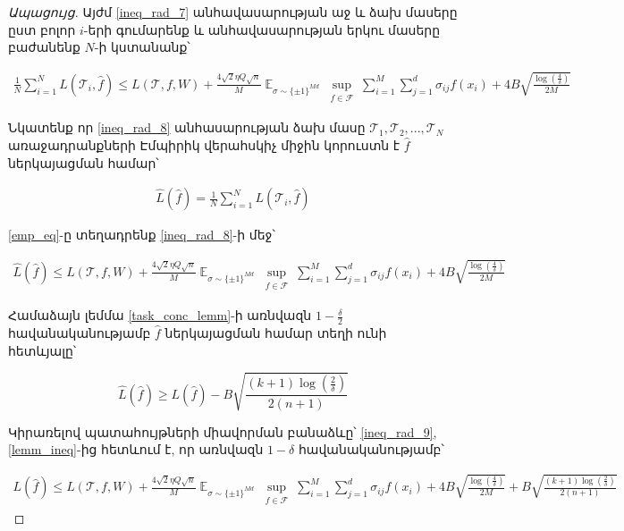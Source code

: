 \documentclass[12pt]{article}
\DeclareMathOperator*{\E}{\mathbb{E}}
\begin{document}
\begin{proof}[Ապացույց]
Այժմ \ref{ineq_rad_7} անհավասարության աջ և ձախ մասերը ըստ բոլոր $i $-երի գումարենք և անհավասարության երկու մասերը բաժանենք $N$-ի կստանանք՝

\begin{align}
\label{ineq_rad_8}
\frac{1}{N}\sum_{i=1}^NL(\mathcal{T}_i, \hat{f}) \leq  L(\mathcal{T}, f, W) + \frac{4\sqrt{2} \eta Q\sqrt{n}}{M} \E_{\sigma \sim \{\pm1\}^{Md}} \sup_{\substack{ f  \in \mathcal{F}  }}\sum_{i=1}^M \sum_{j=1}^d \sigma_{ij}f(x_i)+    4B\sqrt{\frac{\log \left( \frac{4}{\delta} \right)}{2M}}
\end{align}

Նկատենք որ \ref{ineq_rad_8} անհասարության ձախ մասը $\mathcal{T}_1,\mathcal{T}_2, ...,\mathcal{T}_N$ առաջադրանքների Էմպիրիկ վերահսկիչ միջին կորուստն է $\hat{f}$ ներկայացման համար՝


\begin{align}
\label{emp_eq}
\hat{L}(\hat{f}) = \frac{1}{N}\sum_{i=1}^NL(\mathcal{T}_i, \hat{f})
\end{align}

\ref{emp_eq}-ը տեղադրենք \ref{ineq_rad_8}-ի մեջ՝
 
\begin{align}
\label{ineq_rad_9}
\hat{L}(\hat{f}) \leq  L(\mathcal{T}, f, W) + \frac{4\sqrt{2} \eta Q\sqrt{n}}{M} \E_{\sigma \sim \{\pm1\}^{Md}} \sup_{\substack{ f  \in \mathcal{F}  }}\sum_{i=1}^M \sum_{j=1}^d \sigma_{ij}f(x_i)+    4B\sqrt{\frac{\log \left( \frac{4}{\delta} \right)}{2M}}
\end{align}

Համաձայն լեմմա \ref{task_conc_lemm}-ի առնվազն $1-\frac{\delta}{2}$ հավանականությամբ $\hat{f}$ ներկայացման համար տեղի ունի հետևյալը՝


\begin{equation}
\label{lemm_ineq}
\hat{L}(\hat{f}) \geq L(\hat{f}) - B\sqrt{\frac{\left(k+1\right)\log \left(\frac{2}{\delta}\right) }{2(n+1)}}
\end{equation}



Կիրառելով պատահույթների միավորման բանաձևը՝ \ref{ineq_rad_9}, \ref{lemm_ineq}-ից  հետևում է, որ առնվազն $1-\delta$ հավանականությամբ՝

 
\begin{align*}
\label{ineq_rad_10}
L(\hat{f}) \leq  L(\mathcal{T}, f, W) + \frac{4\sqrt{2} \eta Q\sqrt{n}}{M} \E_{\sigma \sim \{\pm1\}^{Md}} \sup_{\substack{ f  \in \mathcal{F}  }}\sum_{i=1}^M \sum_{j=1}^d \sigma_{ij}f(x_i)+    4B\sqrt{\frac{\log \left( \frac{4}{\delta} \right)}{2M}} + B\sqrt{\frac{\left(k+1\right)\log \left(\frac{2}{\delta}\right) }{2(n+1)}}
\end{align*}

 \end{proof}
\end{document}
